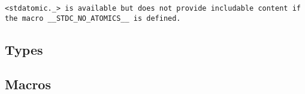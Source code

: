 \def\Subsection#1{\subsection{#1}}

\tt{<stdatomic._>} is available but does not provide
includable content if the macro \tt{__STDC_NO_ATOMICS__} is defined.

\Subsection{Types}

\Subsection{Macros}
